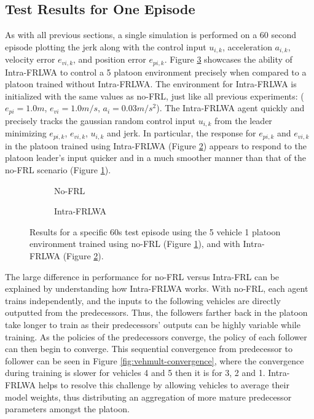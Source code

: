 \subsection{Test Results for One Episode}
As with all previous sections, a single simulation is performed on a 60 second episode
plotting the jerk along with the control input $u_{i,k}$, acceleration $a_{i,k}$,
velocity error $e_{vi,k}$, and position error $e_{pi,k}$.
Figure \ref{fig:intraFRL-vehmult-simresult} showcases the ability of Intra-FRLWA to
control a 5 platoon environment precisely when compared to a platoon trained without
Intra-FRLWA.  The environment for Intra-FRLWA is initialized with the same values as
no-FRL, just like all previous experiments:
($e_{pi} = 1.0 m$, $e_{vi}=1.0 m/s$, $a_i = 0.03 m/s^2$). The Intra-FRLWA agent quickly
and precisely tracks the gaussian random control input $u_{i,k}$ from the leader minimizing
$e_{pi,k}$, $e_{vi,k}$, $u_{i,k}$ and jerk. In particular, the response for $e_{pi,k}$ and
$e_{vi,k}$ in the platoon trained using Intra-FRLWA
(Figure \ref{fig:sim_guassian_p1_5v_intrafrlwa}) appears to respond to the platoon
leader's input quicker and in a much smoother manner than that of the no-FRL
scenario (Figure \ref{fig:sim_guassian_p1_5v_nofrl}).

\begin{figure}[H]
\centering
    \begin{subfigure}{0.45\textwidth}
        \centering
        
      \caption{No-FRL}\label{fig:sim_guassian_p1_5v_nofrl}
    \end{subfigure}\hspace{\interfrlRewSpace}
    \begin{subfigure}{0.45\textwidth}
        \centering
        
      \caption{Intra-FRLWA}\label{fig:sim_guassian_p1_5v_intrafrlwa}
    \end{subfigure}
\caption{Results for a specific 60s test episode using the 5 vehicle 1 platoon environment trained using no-FRL (Figure \ref{fig:sim_guassian_p1_5v_nofrl}), and with Intra-FRLWA (Figure \ref{fig:sim_guassian_p1_5v_intrafrlwa}).}
\label{fig:intraFRL-vehmult-simresult}
\end{figure}

The large difference in performance for no-FRL versus Intra-FRL can be explained by
understanding how Intra-FRLWA works. With no-FRL, each agent trains independently, and
the inputs to the following vehicles are directly outputted from the predecessors. Thus,
the followers farther back in the platoon take longer to train as their predecessors'
outputs can be highly variable while training. As the policies of the predecessors
converge, the policy of each follower can then begin to converge. This sequential
convergence from predecessor to follower can be seen in Figure \ref{fig:vehmult-convergence},
where the convergence during training is slower for vehicles 4 and 5 then it is for 3, 2
and 1. Intra-FRLWA helps to resolve this challenge by allowing vehicles to average
their model weights, thus distributing an aggregation of more mature predecessor parameters
amongst the platoon.